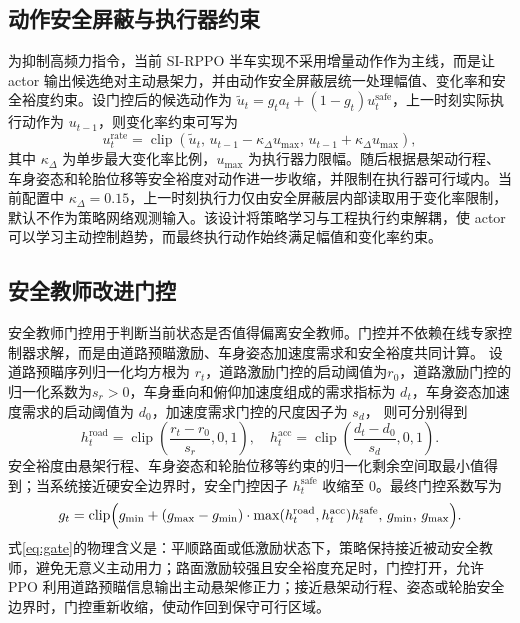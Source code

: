 \subsection{动作安全屏蔽与执行器约束}
为抑制高频力指令，当前 SI-RPPO 半车实现不采用增量动作作为主线，而是让 actor 输出候选绝对主动悬架力，并由动作安全屏蔽层统一处理幅值、变化率和安全裕度约束。设门控后的候选动作为 $\tilde u_t=g_ta_t+(1-g_t)u_t^{\mathrm{safe}}$，上一时刻实际执行动作为 $u_{t-1}$，则变化率约束可写为
\begin{equation}
u_t^{\mathrm{rate}}=
\operatorname{clip}\!\left(\tilde u_t,\,
u_{t-1}-\kappa_{\Delta}u_{\max},\,
u_{t-1}+\kappa_{\Delta}u_{\max}\right),
\label{eq:rate_limit}
\end{equation}
其中 $\kappa_{\Delta}$ 为单步最大变化率比例，$u_{\max}$ 为执行器力限幅。随后根据悬架动行程、车身姿态和轮胎位移等安全裕度对动作进一步收缩，并限制在执行器可行域内。当前配置中 $\kappa_{\Delta}=0.15$，上一时刻执行力仅由安全屏蔽层内部读取用于变化率限制，默认不作为策略网络观测输入。该设计将策略学习与工程执行约束解耦，使 actor 可以学习主动控制趋势，而最终执行动作始终满足幅值和变化率约束。

\subsection{安全教师改进门控}
安全教师门控用于判断当前状态是否值得偏离安全教师。门控并不依赖在线专家控制器求解，而是由道路预瞄激励、车身姿态加速度需求和安全裕度共同计算。
设道路预瞄序列归一化均方根为 $r_t$，道路激励门控的启动阈值为$r_0$，道路激励门控的归一化系数为$s_r>0$，车身垂向和俯仰加速度组成的需求指标为 $d_t$，车身姿态加速度需求的启动阈值为 $d_0$，加速度需求门控的尺度因子为 $s_d$，
则可分别得到
\begin{equation}
h_t^{\mathrm{road}}=\operatorname{clip}\!\left(\frac{r_t-r_0}{s_r},0,1\right),\quad
h_t^{\mathrm{acc}}=\operatorname{clip}\!\left(\frac{d_t-d_0}{s_d},0,1\right).
\end{equation}
安全裕度由悬架行程、车身姿态和轮胎位移等约束的归一化剩余空间取最小值得到；当系统接近硬安全边界时，安全门控因子 $h_t^{\mathrm{safe}}$ 收缩至 0。最终门控系数写为
\begin{equation}
g_t=\operatorname{clip}\Bigl(g_{\min}+(g_{\max}-g_{\min})
\cdot\max(h_t^{\mathrm{road}},h_t^{\mathrm{acc}})h_t^{\mathrm{safe}},\,g_{\min},\,g_{\max}\Bigr).
\label{eq:gate}
\end{equation}
式\eqref{eq:gate}的物理含义是：平顺路面或低激励状态下，策略保持接近被动安全教师，避免无意义主动用力；路面激励较强且安全裕度充足时，门控打开，允许 PPO 利用道路预瞄信息输出主动悬架修正力；接近悬架动行程、姿态或轮胎安全边界时，门控重新收缩，使动作回到保守可行区域\cite{alshiekh2018safe,dalal2018safe,cheng2019end}。


